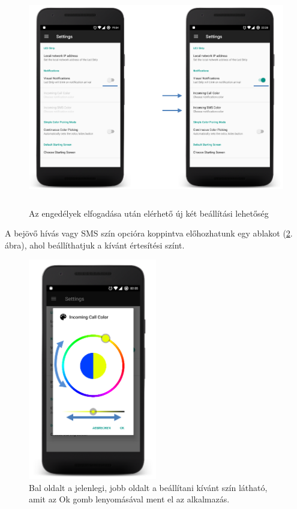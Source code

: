 \documentclass[../main.tex]{subfiles}
\begin{document}
                \begin{figure}[!h]
                    \includegraphics[height=9.5cm]{android_res/screen_pictures/visual_notification_01.png}
                    \caption{Az engedélyek elfogadása után elérhető új két beállítási lehetőség}
                     \label{fig:vis_not_01}
                \end{figure}
                
                A bejövő hívás vagy SMS szín opcióra koppintva előhozhatunk egy ablakot (\ref{fig:vis_not_03}. ábra), ahol beállíthatjuk a kívánt értesítési színt. 
                
                \begin{figure}[!h]
                    \includegraphics[width=5.6cm]{android_res/screen_pictures/visual_notification_03.png}
                    \caption{Bal oldalt a jelenlegi, jobb oldalt a beállítani kívánt szín látható, amit az Ok gomb lenyomásával ment el az alkalmazás.}
                    \label{fig:vis_not_03}
                \end{figure}
            
\end{document}
